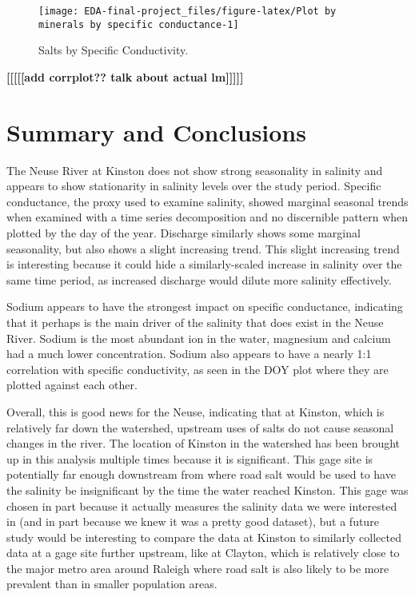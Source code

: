 \documentclass[
  12pt,
]{article}
\begin{document}
\begin{figure}

{\centering \texttt{[image: EDA-final-project\_files/figure-latex/Plot by minerals by specific conductance-1]} 

}

\caption{Salts by Specific Conductivity.}\label{fig:Plot by minerals by specific conductance}
\end{figure}

\textbf{{[}{[}{[}{[}{[}add corrplot?? talk about actual
lm{]}{]}{]}{]}{]}}

\newpage

\hypertarget{summary-and-conclusions}{%
\section{Summary and Conclusions}\label{summary-and-conclusions}}

The Neuse River at Kinston does not show strong seasonality in salinity
and appears to show stationarity in salinity levels over the study
period. Specific conductance, the proxy used to examine salinity, showed
marginal seasonal trends when examined with a time series decomposition
and no discernible pattern when plotted by the day of the year.
Discharge similarly shows some marginal seasonality, but also shows a
slight increasing trend. This slight increasing trend is interesting
because it could hide a similarly-scaled increase in salinity over the
same time period, as increased discharge would dilute more salinity
effectively.

Sodium appears to have the strongest impact on specific conductance,
indicating that it perhaps is the main driver of the salinity that does
exist in the Neuse River. Sodium is the most abundant ion in the water,
magnesium and calcium had a much lower concentration. Sodium also
appears to have a nearly 1:1 correlation with specific conductivity, as
seen in the DOY plot where they are plotted against each other.

Overall, this is good news for the Neuse, indicating that at Kinston,
which is relatively far down the watershed, upstream uses of salts do
not cause seasonal changes in the river. The location of Kinston in the
watershed has been brought up in this analysis multiple times because it
is significant. This gage site is potentially far enough downstream from
where road salt would be used to have the salinity be insignificant by
the time the water reached Kinston. This gage was chosen in part because
it actually measures the salinity data we were interested in (and in
part because we knew it was a pretty good dataset), but a future study
would be interesting to compare the data at Kinston to similarly
collected data at a gage site further upstream, like at Clayton, which
is relatively close to the major metro area around Raleigh where road
salt is also likely to be more prevalent than in smaller population
areas.
\end{document}
